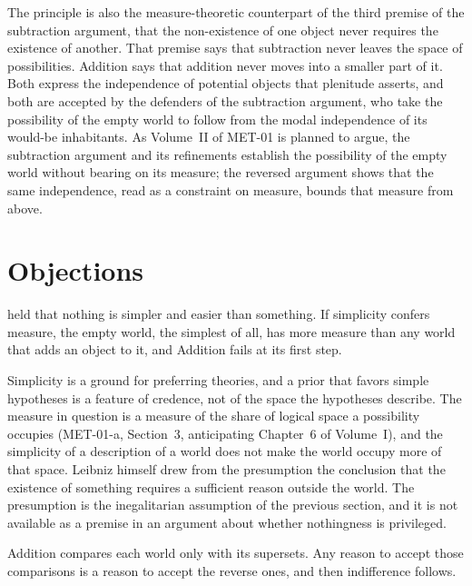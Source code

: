 \documentclass{situationist-preprint}
\begin{document}
The principle is also the measure-theoretic counterpart of the third premise of the subtraction argument, that the non-existence of one object never requires the existence of another. That premise says that subtraction never leaves the space of possibilities. Addition says that addition never moves into a smaller part of it. Both express the independence of potential objects that plenitude asserts, and both are accepted by the defenders of the subtraction argument, who take the possibility of the empty world to follow from the modal independence of its would-be inhabitants. As Volume~II of MET-01 is planned to argue, the subtraction argument and its refinements establish the possibility of the empty world without bearing on its measure; the reversed argument shows that the same independence, read as a constraint on measure, bounds that measure from above.

\section{Objections}

\begin{objection}
\citet[\S 7]{Leibniz1714} held that nothing is simpler and easier than something. If simplicity confers measure, the empty world, the simplest of all, has more measure than any world that adds an object to it, and Addition fails at its first step.
\end{objection}

\begin{reply}
Simplicity is a ground for preferring theories, and a prior that favors simple hypotheses is a feature of credence, not of the space the hypotheses describe. The measure in question is a measure of the share of logical space a possibility occupies (MET-01-a, Section~3, anticipating Chapter~6 of Volume~I), and the simplicity of a description of a world does not make the world occupy more of that space. Leibniz himself drew from the presumption the conclusion that the existence of something requires a sufficient reason outside the world. The presumption is the inegalitarian assumption of the previous section, and it is not available as a premise in an argument about whether nothingness is privileged.
\end{reply}

\begin{objection}
Addition compares each world only with its supersets. Any reason to accept those comparisons is a reason to accept the reverse ones, and then indifference follows.
\end{objection}
\end{document}
